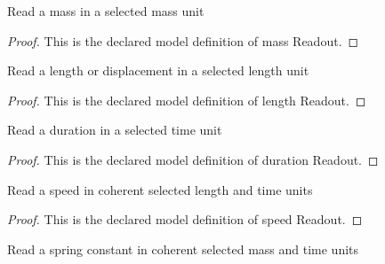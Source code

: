 \begin{definition}
  \label{def:physics:phyx-mini-0236:phyxminiproblems-problemphyxmini0236-massreadout}
  Read a mass in a selected mass unit
\end{definition}
\begin{proof}
  This is the declared model definition of mass Readout.
\end{proof}
\begin{definition}
  \label{def:physics:phyx-mini-0236:phyxminiproblems-problemphyxmini0236-lengthreadout}
  Read a length or displacement in a selected length unit
\end{definition}
\begin{proof}
  This is the declared model definition of length Readout.
\end{proof}
\begin{definition}
  \label{def:physics:phyx-mini-0236:phyxminiproblems-problemphyxmini0236-durationreadout}
  Read a duration in a selected time unit
\end{definition}
\begin{proof}
  This is the declared model definition of duration Readout.
\end{proof}
\begin{definition}
  \label{def:physics:phyx-mini-0236:phyxminiproblems-problemphyxmini0236-speedreadout}
  Read a speed in coherent selected length and time units
\end{definition}
\begin{proof}
  This is the declared model definition of speed Readout.
\end{proof}
\begin{definition}
  \label{def:physics:phyx-mini-0236:phyxminiproblems-problemphyxmini0236-springconstantreadout}
  Read a spring constant in coherent selected mass and time units
\end{definition}
